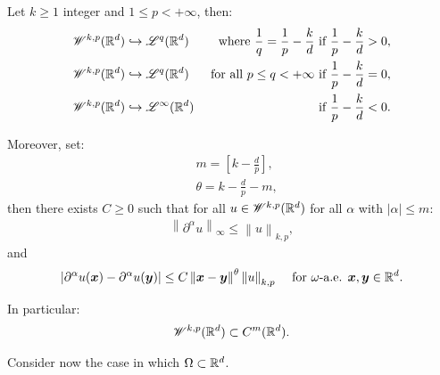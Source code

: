 \begin{corollary} \label{corollary:embedding}
    Let $k \geq 1$ integer and $1 \leq p < +\infty$, then:
    \begin{align}
        \mathscr{W}^{k, p}(\mathbb{R}^{d}) & \hookrightarrow \mathscr{L}^{q}(\mathbb{R}^{d}) &\text{ where } \frac{1}{q} = \frac{1}{p} - \frac{k}{d} \text{ if } \frac{1}{p} - \frac{k}{d} > 0, \\
        \mathscr{W}^{k, p}(\mathbb{R}^{d}) & \hookrightarrow \mathscr{L}^{q}(\mathbb{R}^{d}) &\text{ for all } p \leq q < +\infty \text{ if } \frac{1}{p} - \frac{k}{d} = 0, \\
        \mathscr{W}^{k, p}(\mathbb{R}^{d}) & \hookrightarrow \mathscr{L}^{\infty}(\mathbb{R}^{d}) & \text{ if } \frac{1}{p} - \frac{k}{d} < 0.
    \end{align}

    Moreover, set:
    \begin{align}
        & m = \left[ k - \frac{d}{p} \right], \\
        & \theta = k - \frac{d}{p} - m,
    \end{align}
    then there exists $C \geq 0$ such that for all $u \in \mathscr{W}^{k, p}(\mathbb{R}^{d})$ for all $\alpha$ with $\left\lvert \alpha \right\rvert \leq m$:
    \begin{align}
        \left\lVert \partial^{\alpha} u \right\rVert_{\infty} \leq \left\lVert u \right\rVert_{k, p},
    \end{align}
    and
    \begin{align}
        \left\lvert \partial^{\alpha} u(\bm{x}) - \partial^{\alpha} u(\bm{y}) \right\rvert &\leq C \left\lVert \bm{x} - \bm{y} \right\rVert^{\theta} \left\lVert u \right\rVert_{k, p} &\text{ for } \omega \text{-a.e. } \bm{x}, \bm{y} \in \mathbb{R}^{d}.
    \end{align}

    In particular:
    \begin{align}
        \mathscr{W}^{k, p}(\mathbb{R}^{d}) \subset C^m(\mathbb{R}^{d}).
    \end{align}
\end{corollary}

Consider now the case in which $\Omega \subset \mathbb{R}^{d}$.

